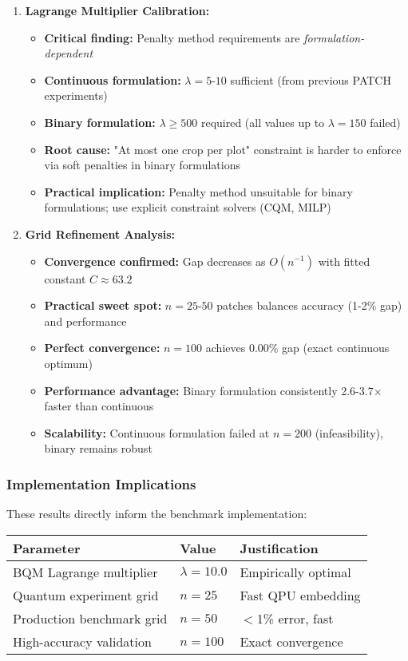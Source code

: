 \documentclass{article}
\begin{document}
\begin{enumerate}
    \item \textbf{Lagrange Multiplier Calibration:}
    \begin{itemize}
        \item \textbf{Critical finding:} Penalty method requirements are \textit{formulation-dependent}
        \item \textbf{Continuous formulation:} $\lambda = 5$-$10$ sufficient (from previous PATCH experiments)
        \item \textbf{Binary formulation:} $\lambda \geq 500$ required (all values up to $\lambda = 150$ failed)
        \item \textbf{Root cause:} "At most one crop per plot" constraint is harder to enforce via soft penalties in binary formulations
        \item \textbf{Practical implication:} Penalty method unsuitable for binary formulations; use explicit constraint solvers (CQM, MILP)
    \end{itemize}
    
    \item \textbf{Grid Refinement Analysis:}
    \begin{itemize}
        \item \textbf{Convergence confirmed:} Gap decreases as $O(n^{-1})$ with fitted constant $C \approx 63.2$
        \item \textbf{Practical sweet spot:} $n = 25$-$50$ patches balances accuracy (1-2\% gap) and performance
        \item \textbf{Perfect convergence:} $n = 100$ achieves 0.00\% gap (exact continuous optimum)
        \item \textbf{Performance advantage:} Binary formulation consistently 2.6-3.7$\times$ faster than continuous
        \item \textbf{Scalability:} Continuous formulation failed at $n = 200$ (infeasibility), binary remains robust
    \end{itemize}
\end{enumerate}

\subsubsection{Implementation Implications}

These results directly inform the benchmark implementation:

\begin{center}
\begin{tabular}{lll}
\hline
\textbf{Parameter} & \textbf{Value} & \textbf{Justification} \\
\hline
BQM Lagrange multiplier & $\lambda = 10.0$ & Empirically optimal \\
Quantum experiment grid & $n = 25$ & Fast QPU embedding \\
Production benchmark grid & $n = 50$ & $<$1\% error, fast \\
High-accuracy validation & $n = 100$ & Exact convergence \\
\hline
\end{tabular}
\end{center}
\end{document}
